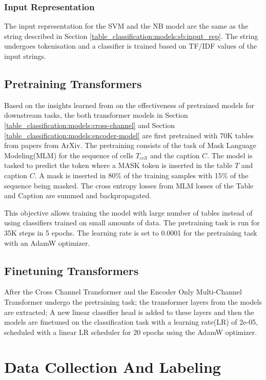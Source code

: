 \subsubsection{Input Representation}
The input representation for the SVM and the NB model are the same as the string described in Section \ref{table_classification:models:sb:input_rep}. The string undergoes tokenisation and a classifier is trained based on TF/IDF values of the input strings. 

\subsection{Pretraining Transformers}
\label{table_classification:models:encoder-model:pre-train}
Based on the insights learned from \cite{hernandez2021scaling} on the effectiveness of pretrained models for downstream tasks, the both transformer models in Section \ref{table_classification:models:cross-channel} and Section \ref{table_classification:models:encoder-model} are first pretrained with 70K tables from papers from ArXiv. The pretraining consists of the task of Mask Language Modeling(MLM) for the sequence of cells $T_{cell}$ and the caption $C$. The model is tasked to predict the token where a MASK token is inserted in the table $T$ and caption $C$. A mask is inserted in 80\% of the training samples with 15\% of the sequence being masked. The cross entropy losses from MLM losses of the Table and Caption are summed and backpropagated.

This objective allows training the model with large number of tables instead of using classifiers trained on small amounts of data. The pretraining task is run for 35K steps in 5 epochs. The learning rate is set to 0.0001 for the pretraining task with an AdamW \parencite{loshchilov2017decoupled} optimizer. 

\subsection{Finetuning Transformers}
After the Cross Channel Transformer and the Encoder Only Multi-Channel Transformer undergo the pretraining task; the transformer layers from the models are extracted; A new linear classifier head is added to these layers and then the models are finetuned on the classification task with a learning rate(LR) of 2e-05, scheduled with a linear LR scheduler for 20 epochs using the AdamW optimizer. 

\section{Data Collection And Labeling}
\label{table_classification:data-coll}

